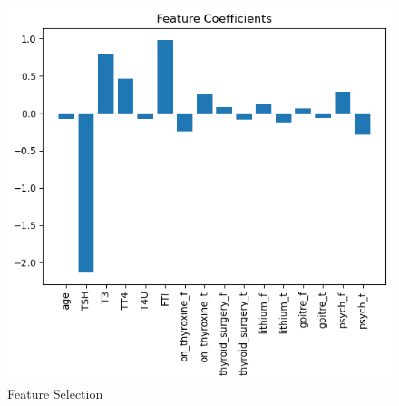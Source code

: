 \begin{figure}[h]
\centering
\includegraphics[scale=0.75]{featureselect.png}
\caption{Feature Selection}
\end{figure}

